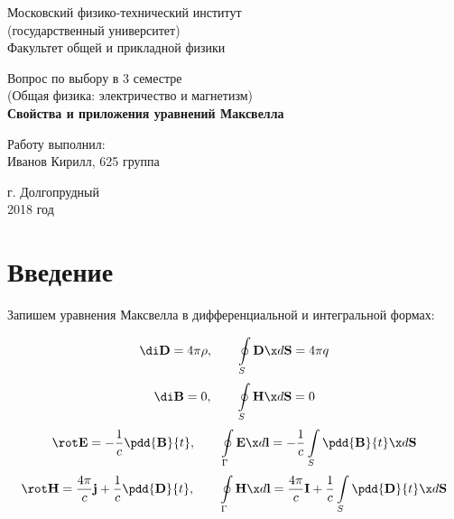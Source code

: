 \documentclass[12pt]{kiarticle}
\begin{document}
	
	\begin{titlepage}
	\begin{center}
		\large 	Московский физико-технический институт \\
		(государственный университет) \\
		Факультет общей и прикладной физики \\
		\vspace{0.2cm}
		
		\vspace{4.5cm}
		Вопрос по выбору в 3 семестре \\ \vspace{0.2cm}
		\large (Общая физика: электричество и магнетизм) \\ \vspace{0.2cm}
		\LARGE \textbf{Свойства и приложения уравнений Максвелла}
	\end{center}
	\vspace{2.3cm} \large
	
	\begin{center}
		Работу выполнил: \\
		Иванов Кирилл,
		625 группа
		\vspace{10mm}		
		
	\end{center}
	
	\begin{center} \vspace{60mm}
		г. Долгопрудный \\
		2018 год
	\end{center}
\end{titlepage}



\section{Введение}

Запишем уравнения Максвелла в дифференциальной и интегральной формах: 

\begin{equation}\label{Gauss_E}
\di \mathbf{D} = 4\pi\rho, \qquad
\oint\limits_S  \mathbf{D} \x d\mathbf{S} = 4\pi q
\end{equation}
\begin{equation}\label{Gauss_B}
\di \textbf{B} = 0 , \qquad
\oint\limits_S  \mathbf{H} \x d\mathbf{S} =  0
\end{equation}
\begin{equation}\label{Faradey}
\rot \mathbf{E} = -\dfrac{1}{c}\pdd{\mathbf{B}}{t}, \qquad \oint\limits_\Gamma \mathbf{E} \x d\mathbf{l} = - \dfrac{1}{c} \int\limits_S  \pdd{\mathbf{B}}{t} \x d\mathbf{S}
\end{equation}
\begin{equation}\label{Circ_H}
\rot \mathbf{H} = \dfrac{4\pi}{c}\mathbf{j} + \dfrac{1}{c}\pdd{\mathbf{D}}{t}, \qquad
\oint\limits_\Gamma \mathbf{H} \x d\mathbf{l} = \dfrac{4\pi}{c}\mathbf{I} + \dfrac{1}{c} \int\limits_S  \pdd{\mathbf{D}}{t} \x d\mathbf{S} 
\end{equation}
\end{document}
